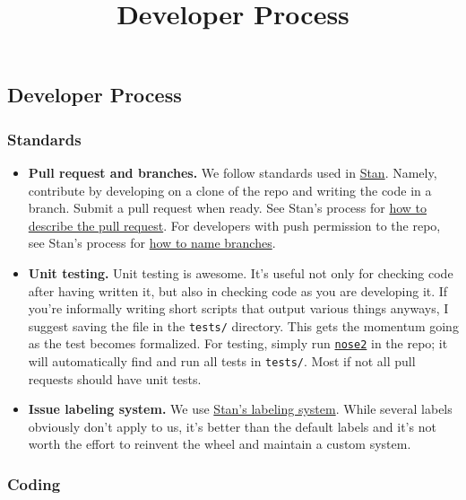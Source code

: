 \title{Developer Process}

\subsection{Developer Process}

\subsubsection{Standards}

\begin{itemize}
\item
  \textbf{Pull request and branches.} We follow standards used in 
  \href{http://mc-stan.org/}{Stan}.
  Namely, contribute by developing on a clone of the repo and writing
  the code in a branch. Submit a pull request when ready. See Stan's
  process for
  \href{https://github.com/stan-dev/stan/wiki/Developer-Process\#information-to-include-in-pull-request}{how
  to describe the pull request}. For developers with push permission to
  the repo, see Stan's process for
  \href{https://github.com/stan-dev/stan/wiki/Developer-Process\#4--how-to-contribute-with-a-clone-of-the-repository}{how
  to name branches}.
\item
  \textbf{Unit testing.} Unit testing is awesome. It's useful not only
  for checking code after having written it, but also in checking code
  as you are developing it. If you're informally writing short scripts
  that output various things anyways, I suggest saving the file in the
  \texttt{tests/} directory. This gets the momentum going as the test
  becomes formalized. For testing, simply run
  \href{http://nose2.readthedocs.io/en/latest/getting_started.html}{\texttt{nose2}}
  in the repo; it will automatically find and run all tests in
  \texttt{tests/}. Most if not all pull requests should have unit tests.
\item
  \textbf{Issue labeling system.} We use
  \href{https://github.com/stan-dev/stan/pulls}{Stan's labeling system}.
  While several labels obviously don't apply to us, it's better than the
  default labels and it's not worth the effort to reinvent the wheel and
  maintain a custom system.
\end{itemize}

\subsubsection{Coding}

